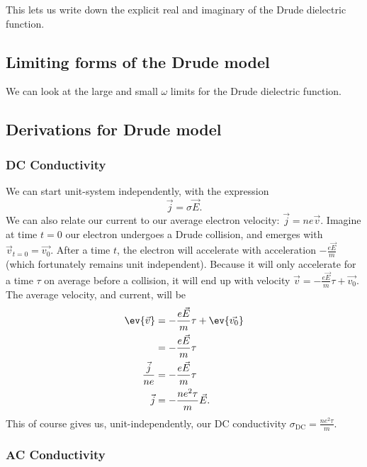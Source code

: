 \documentclass[../../main.tex]{subfiles}
\newcommand{\sigmaDC}{\sigma_{\textrm{DC}}}
\begin{document}
This lets us write down the explicit real and imaginary of the Drude dielectric function.

\subsection{Limiting forms of the Drude model}
We can look at the large and small $\omega$ limits for the Drude dielectric function.

\subsection{Derivations for Drude model}

\subsubsection{DC Conductivity}
We can start unit-system independently, with the expression 
\begin{equation}
	{\vec{j}} = \sigma \vec{E}. \label{eq:DrudeTheory:ConductivityDef}
\end{equation}
We can also relate our current to our average electron velocity: $\vec{j} = n e \vec{v}$. Imagine at time $t = 0$ our electron undergoes a Drude collision, and emerges with $\vec{v}_{t = 0} = \vec{v_0}$. After a time $t$, the electron will accelerate with acceleration $-\frac{e \vec{E}}{m}$ (which fortunately remains unit independent). Because it will only accelerate for a time $\tau$ on average before a collision, it will end up with velocity $\vec{v} = -\frac{e \vec{E}}{m}\tau + \vec{v_0}$. The average velocity, and current, will be 
\begin{align}
	\ev{\vec{v}} &= - \frac{e \vec{E}}{m}\tau + \ev{\vec{v_0}} \\
	&= - \frac{e \vec{E}}{m}\tau \\
	\frac{\vec{j}}{ne} &= - \frac{e \vec{E}}{m}\tau \\
	\vec{j} &= - \frac{n e^2 \tau}{m} \vec{E}.
\end{align}
This of course gives us, unit-independently, our DC conductivity $\sigmaDC = \frac{n e^2 \tau}{m}$. 	

\subsubsection{AC Conductivity} 
\end{document}
